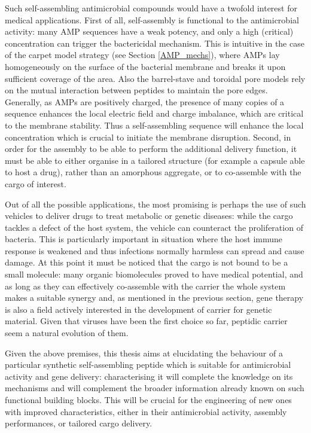Such self-assembling antimicrobial compounds would have a twofold interest for medical applications.
%
First of all, self-assembly is functional to the antimicrobial activity: many AMP sequences have a weak potency, and only a high (critical) concentration can trigger the bactericidal mechanism. This is intuitive in the case of the carpet model strategy (see Section \ref{AMP_mechs}), where AMPs lay homogeneously on the surface of the bacterial membrane and breaks it upon sufficient coverage of the area. Also the barrel-stave and toroidal pore models rely on the mutual interaction between peptides to maintain the pore edges.
%
Generally, as AMPs are positively charged, the presence of many copies of a sequence enhances the local electric field and charge imbalance, which are critical to the membrane stability. Thus a self-assembling sequence will enhance the local concentration which is crucial to initiate the membrane disruption.
%
Second, in order for the assembly to be able to perform the additional delivery function, it must be able to either organise in a tailored structure (for example a capsule able to host a drug), rather than an amorphous aggregate, or to co-assemble with the cargo of interest.

Out of all the possible applications, the most promising is perhaps the use of such vehicles to deliver drugs to treat metabolic or genetic diseases: while the cargo tackles a defect of the host system, the vehicle can counteract the proliferation of bacteria. This is particularly important in situation where the host immune response is weakened and thus infections normally harmless can spread and cause damage.
%
At this point it must be noticed that the cargo is not bound to be a small molecule: many organic biomolecules proved to have medical potential, and as long as they can effectively co-assemble with the carrier the whole system makes a suitable synergy and, as mentioned in the previous section, gene therapy is also a field actively interested in the development of carrier for genetic material. Given that viruses have been the first choice so far, peptidic carrier seem a natural evolution of them.

\vspace{1cm}
Given the above premises, this thesis aims at elucidating the behaviour of a particular synthetic self-assembling peptide which is suitable for antimicrobial activity and gene delivery: characterising it will complete the knowledge on its mechanisms and will complement the broader information already known on such functional building blocks. This will be crucial for the engineering of new ones with improved characteristics, either in their antimicrobial activity, assembly performances, or tailored cargo delivery.


